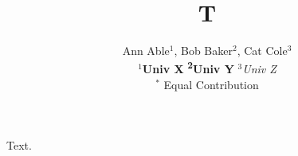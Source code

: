 \documentclass{article}
\begin{document}
\title{T}
\author{Ann Able$^{1}$, Bob Baker$^{2}$, Cat Cole$^{3}$\\ \textbf{$^1$Univ X}  \textbf{\textsuperscript{2}Univ Y}  {\it $^3$Univ Z}\\ $^*$ Equal Contribution}
\maketitle
Text.
\end{document}
